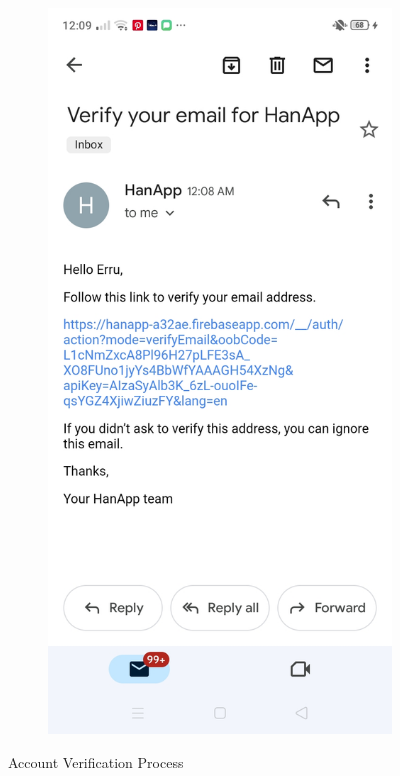 \begin{figure}[!h]
\begin{subfigure}[c]{0.30\linewidth}
    \end{subfigure}
    \centering
    \begin{subfigure}[c]{0.30\linewidth}
        \centering
        \includegraphics[scale=0.15]{figures/Chapter4/Main/Verification-2.jpg}
    \end{subfigure}
    \caption{Account Verification Process}
    \label{fig:accountVerification}
\end{figure}

